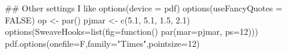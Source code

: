\begin{Schunk}
\begin{Sinput}
 ## Other settings I like
 options(device = pdf)
 options(useFancyQuotes = FALSE) 
 op <- par() 
 pjmar <- c(5.1, 5.1, 1.5, 2.1) 
 options(SweaveHooks=list(fig=function() par(mar=pjmar, ps=12)))
 pdf.options(onefile=F,family="Times",pointsize=12)
\end{Sinput}
\end{Schunk}
